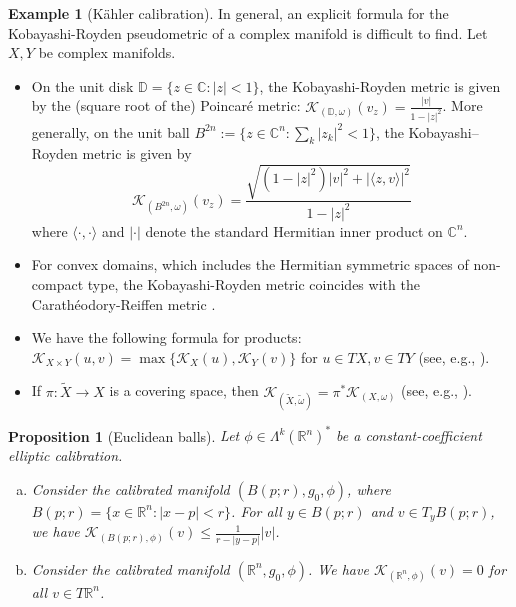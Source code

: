 \documentclass[11pt]{article}
\newcommand{\R}{\mathbb{R}}
\newcommand{\C}{\mathbb{C}}
\newtheorem{prop}[thm]{Proposition}
\theoremstyle{definition}
\newtheorem{example}[thm]{Example}
\numberwithin{equation}{section}
\begin{document}
\begin{example}[K\"{a}hler calibration] \label{ex:KobRoyden} In general, an explicit formula for the Kobayashi-Royden pseudometric of a complex manifold is difficult to find.  Let $X,Y$ be complex manifolds.
\begin{itemize}
\item On the unit disk $\mathbb{D} = \{ z \in \mathbb{C} : | z|<1 \}$, the Kobayashi-Royden metric is given by the (square root of the) Poincar\'e metric: $\mathcal{K}_{(\mathbb{D}, \omega)}(v_z) = \frac{|v|}{1-|z|^2}$.  More generally, on the unit ball $B^{2n} := \{ z \in \C^n \colon \sum_k | z_k |^2 <1 \}$, the Kobayashi--Royden metric is given by
$$\mathcal{K}_{(B^{2n}, \omega)}(v_z) = \frac{\sqrt{(1-|z|^2)|v|^2 + | \langle z,v \rangle |^2}}{1-|z|^2}$$
where $\langle \cdot, \cdot \rangle$ and $|\cdot|$ denote the standard Hermitian inner product on $\C^n$.
\item For convex domains, which includes the Hermitian symmetric spaces of non-compact type, the Kobayashi-Royden metric coincides with the Carath\'eodory-Reiffen metric \cite{lempert1981metrique}.
\item We have the following formula for products: $\mathcal{K}_{X \times Y}(u,v) = \max \{ \mathcal{K}_X(u), \mathcal{K}_Y(v)\}$ for $u \in TX, v \in TY$ (see, e.g., \cite[Proposition 3.5.25]{kobayashi2013hyperbolic}).
\item If $\pi \colon \widetilde{X} \to X$ is a covering space, then $\mathcal{K}_{( \widetilde{X}, \widetilde{\omega}) } = \pi^{\ast} \mathcal{K}_{(X,\omega)}$ (see, e.g., \cite[Proposition 3.5.26]{kobayashi2013hyperbolic}).
\end{itemize}
\end{example}

\begin{prop}[Euclidean balls] \label{ex:FlatElliptic} Let $\phi \in \Lambda^k(\R^n)^*$ be a constant-coefficient elliptic calibration.
\begin{enumerate}[(a)]
\item Consider the calibrated manifold $(B(p;r), g_0, \phi)$, where $B(p; r) = \{ x \in \R^n \colon |x-p| < r\}$.  For all $y \in B(p;r)$ and $v \in T_yB(p;r)$, we have $\mathcal{K}_{(B(p;r), \phi)}(v) \leq \frac{1}{r - |y-p|}|v|$.
\item Consider the calibrated manifold $(\R^n, g_0, \phi)$.  We have $\mathcal{K}_{(\R^n, \phi)}(v) = 0$ for all $v \in T\R^n$.
\end{enumerate}
\end{prop}
\end{document}

